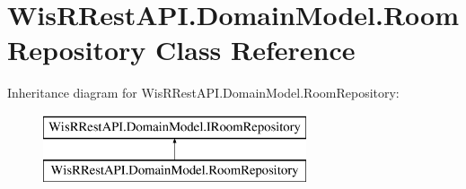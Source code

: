 \hypertarget{class_wis_r_rest_a_p_i_1_1_domain_model_1_1_room_repository}{}\section{Wis\+R\+Rest\+A\+P\+I.\+Domain\+Model.\+Room\+Repository Class Reference}
\label{class_wis_r_rest_a_p_i_1_1_domain_model_1_1_room_repository}
Inheritance diagram for Wis\+R\+Rest\+A\+P\+I.\+Domain\+Model.\+Room\+Repository\+:\begin{figure}[H]
\begin{center}
\leavevmode
\includegraphics[height=2.000000cm]{class_wis_r_rest_a_p_i_1_1_domain_model_1_1_room_repository}
\end{center}
\end{figure}
